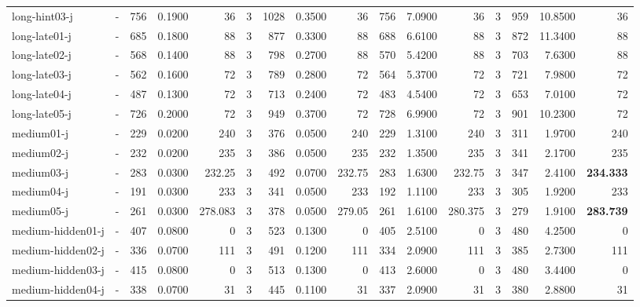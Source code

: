 \documentclass[a4paper]{article}
\begin{document}
\begin{sidewaystable}[h]
\begin{tabular}{l|r|r|r|r|r|r|r|r|r|r|r|r|r|r|r}
long-hint03-j & \multicolumn{1}{c|}{ - } & 756 & 0.1900 & 36 & 3 & 1028 & 0.3500 & 36 & 756 & 7.0900 & 36 & 3 & 959 & 10.8500 & 36 \\
long-late01-j & \multicolumn{1}{c|}{ - } & 685 & 0.1800 & 88 & 3 & 877 & 0.3300 & 88 & 688 & 6.6100 & 88 & 3 & 872 & 11.3400 & 88 \\
long-late02-j & \multicolumn{1}{c|}{ - } & 568 & 0.1400 & 88 & 3 & 798 & 0.2700 & 88 & 570 & 5.4200 & 88 & 3 & 703 & 7.6300 & 88 \\
long-late03-j & \multicolumn{1}{c|}{ - } & 562 & 0.1600 & 72 & 3 & 789 & 0.2800 & 72 & 564 & 5.3700 & 72 & 3 & 721 & 7.9800 & 72 \\
long-late04-j & \multicolumn{1}{c|}{ - } & 487 & 0.1300 & 72 & 3 & 713 & 0.2400 & 72 & 483 & 4.5400 & 72 & 3 & 653 & 7.0100 & 72 \\
long-late05-j & \multicolumn{1}{c|}{ - } & 726 & 0.2000 & 72 & 3 & 949 & 0.3700 & 72 & 728 & 6.9900 & 72 & 3 & 901 & 10.2300 & 72 \\
medium01-j & \multicolumn{1}{c|}{ - } & 229 & 0.0200 & 240 & 3 & 376 & 0.0500 & 240 & 229 & 1.3100 & 240 & 3 & 311 & 1.9700 & 240 \\
medium02-j & \multicolumn{1}{c|}{ - } & 232 & 0.0200 & 235 & 3 & 386 & 0.0500 & 235 & 232 & 1.3500 & 235 & 3 & 341 & 2.1700 & 235 \\
medium03-j & \multicolumn{1}{c|}{ - } & 283 & 0.0300 & 232.25 & 3 & 492 & 0.0700 & 232.75 & 283 & 1.6300 & 232.75 & 3 & 347 & 2.4100 & \textbf{234.333} \\
medium04-j & \multicolumn{1}{c|}{ - } & 191 & 0.0300 & 233 & 3 & 341 & 0.0500 & 233 & 192 & 1.1100 & 233 & 3 & 305 & 1.9200 & 233 \\
medium05-j & \multicolumn{1}{c|}{ - } & 261 & 0.0300 & 278.083 & 3 & 378 & 0.0500 & 279.05 & 261 & 1.6100 & 280.375 & 3 & 279 & 1.9100 & \textbf{283.739} \\
medium-hidden01-j & \multicolumn{1}{c|}{ - } & 407 & 0.0800 & 0 & 3 & 523 & 0.1300 & 0 & 405 & 2.5100 & 0 & 3 & 480 & 4.2500 & 0 \\
medium-hidden02-j & \multicolumn{1}{c|}{ - } & 336 & 0.0700 & 111 & 3 & 491 & 0.1200 & 111 & 334 & 2.0900 & 111 & 3 & 385 & 2.7300 & 111 \\
medium-hidden03-j & \multicolumn{1}{c|}{ - } & 415 & 0.0800 & 0 & 3 & 513 & 0.1300 & 0 & 413 & 2.6000 & 0 & 3 & 480 & 3.4400 & 0 \\
medium-hidden04-j & \multicolumn{1}{c|}{ - } & 338 & 0.0700 & 31 & 3 & 445 & 0.1100 & 31 & 337 & 2.0900 & 31 & 3 & 380 & 2.8800 & 31 \\

\end{tabular}
\end{sidewaystable}
\end{document}
